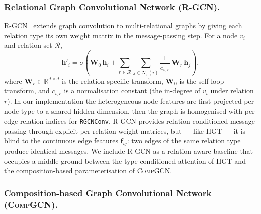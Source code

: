 \documentclass[a4,center]{NAR}
\newcommand{\hgt}{\textsc{HGT}}
\newcommand{\rgcn}{\textsc{R-GCN}}
\newcommand{\compgcn}{\textsc{CompGCN}}
\begin{document}
{\subsubsection{Relational Graph Convolutional Network (\rgcn{}).}
\label{sec:rgcn}

R-GCN~\citep{Schlichtkrull2018ModelingRelational} extends graph convolution to
multi-relational graphs by giving each relation type its own weight matrix in
the message-passing step. For a node $v_i$ and relation set $\mathcal{R}$,
\begin{equation}
    \mathbf{h}'_i = \sigma\!\left(
        \mathbf{W}_0\,\mathbf{h}_i +
        \sum_{r \in \mathcal{R}} \sum_{j \in \mathcal{N}_r(i)}
            \frac{1}{c_{i,r}}\,\mathbf{W}_r\,\mathbf{h}_j
    \right),
    \label{eq:rgcn}
\end{equation}
where $\mathbf{W}_r \in \mathbb{R}^{d \times d}$ is the relation-specific
transform, $\mathbf{W}_0$ is the self-loop transform, and $c_{i,r}$ is a
normalisation constant (the in-degree of $v_i$ under relation $r$). In our
implementation the heterogeneous node features are first projected per
node-type to a shared hidden dimension, then the graph is homogenised with
per-edge relation indices for \texttt{RGCNConv}. \rgcn{} provides
relation-conditioned message passing through explicit per-relation weight
matrices, but --- like \hgt{} --- it is blind to the continuous edge features
$\mathbf{f}_{ij}$: two edges of the same relation type produce identical
messages. We include \rgcn{} as a relation-aware baseline that occupies a
middle ground between the type-conditioned attention of \hgt{} and the
composition-based parameterisation of \compgcn{}.

\subsubsection{Composition-based Graph Convolutional Network (\compgcn{}).}
\label{sec:compgcn}

}
\end{document}
